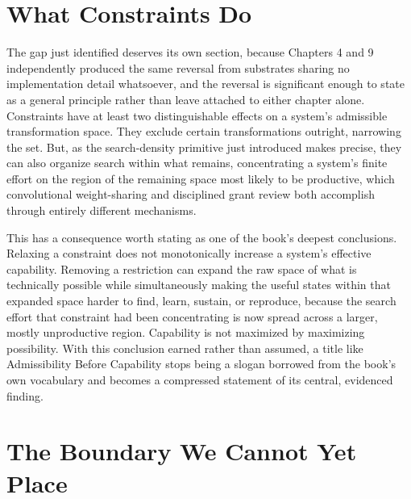 \documentclass[11pt]{book}
\begin{document}
\section{What Constraints Do}

The gap just identified deserves its own section, because Chapters 4 and 9 independently produced the same reversal from substrates sharing no implementation detail whatsoever, and the reversal is significant enough to state as a general principle rather than leave attached to either chapter alone. Constraints have at least two distinguishable effects on a system's admissible transformation space. They exclude certain transformations outright, narrowing the set. But, as the search-density primitive just introduced makes precise, they can also organize search within what remains, concentrating a system's finite effort on the region of the remaining space most likely to be productive, which convolutional weight-sharing and disciplined grant review both accomplish through entirely different mechanisms.

This has a consequence worth stating as one of the book's deepest conclusions. Relaxing a constraint does not monotonically increase a system's effective capability. Removing a restriction can expand the raw space of what is technically possible while simultaneously making the useful states within that expanded space harder to find, learn, sustain, or reproduce, because the search effort that constraint had been concentrating is now spread across a larger, mostly unproductive region. Capability is not maximized by maximizing possibility. With this conclusion earned rather than assumed, a title like Admissibility Before Capability stops being a slogan borrowed from the book's own vocabulary and becomes a compressed statement of its central, evidenced finding.

\section{The Boundary We Cannot Yet Place}
\end{document}
